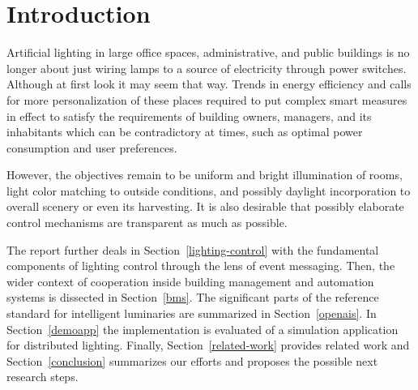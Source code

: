 \documentclass[11pt, english, a4paper, twoside]{article}
\title{\reporttitle}
\author{Bc. Miroslav Hájek}
\date{Faculty of Informatics and Information Technologies\\
      Slovak University of Technology in Bratislava\\[6pt]
      December 14, 2022}
\begin{document}
\maketitle

\begin{abstract}
Smart building automation and specifically intelligent illumination with IoT are deemed to be a highly heterogeneous environment. Vendors provide functionality that is expected to be interoperable. Lately, standards and guidelines have been put in place to enable implementation flexibility and at the same time define uniform interfaces among the components. Communication between sensors and actuators is event-based with an emphasis on low latency and robust fault handling therefore physical placement of service is to be thoroughly considered. The distributed architectures in a smart building control: CONDE and SorBet are compared to extract important conceptual design decisions. The demo application in Rust language is developed according to the leading standard for the internet of lights OpenAIS. The challenges in design and development are discussed toward achieving compliance with reference architecture specification. We discover that group membership forming and asynchronous message coordination are the most critical choices to get right when varying deployment strategies in the sensor network.
\end{abstract}

\section{Introduction}
Artificial lighting in large office spaces, administrative, and public buildings is no longer about just wiring lamps to a source of electricity through power switches. Although at first look it may seem that way. Trends in energy efficiency and calls for more personalization of these places required to put complex smart measures in effect to satisfy the requirements of building owners, managers, and its inhabitants which can be contradictory at times,  such as optimal power consumption and user preferences. 

However, the objectives remain to be uniform and bright illumination of rooms, light color matching to outside conditions, and possibly daylight incorporation to overall scenery or even its harvesting. It is also desirable that possibly elaborate control mechanisms are transparent as much as possible.

The report further deals in Section~\ref{lighting-control} with the fundamental components of lighting control through the lens of event messaging. Then, the wider context of cooperation inside building management and automation systems is dissected in Section~\ref{bms}. The significant parts of the reference standard for intelligent luminaries are summarized in Section~\ref{openais}. In Section~\ref{demoapp} the implementation is evaluated of a simulation application for distributed lighting. Finally, Section~\ref{related-work} provides related work and Section~\ref{conclusion} summarizes our efforts and proposes the possible next research steps.
\end{document}
